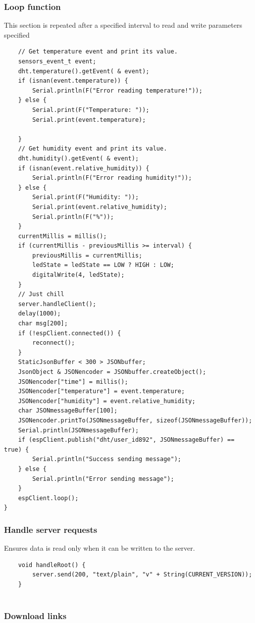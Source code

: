 \subsubsection{Loop function}
This section is repeated after a specified interval to read and write parameters specified

\begin{lstlisting}
	// Get temperature event and print its value.
	sensors_event_t event;
	dht.temperature().getEvent( & event);
	if (isnan(event.temperature)) {
		Serial.println(F("Error reading temperature!"));
	} else {
		Serial.print(F("Temperature: "));
		Serial.print(event.temperature);

	}
	// Get humidity event and print its value.
	dht.humidity().getEvent( & event);
	if (isnan(event.relative_humidity)) {
		Serial.println(F("Error reading humidity!"));
	} else {
		Serial.print(F("Humidity: "));
		Serial.print(event.relative_humidity);
		Serial.println(F("%"));
	}
	currentMillis = millis();
	if (currentMillis - previousMillis >= interval) {
		previousMillis = currentMillis;
		ledState = ledState == LOW ? HIGH : LOW;
		digitalWrite(4, ledState);
	}
	// Just chill
	server.handleClient();
	delay(1000);
	char msg[200];
	if (!espClient.connected()) {
		reconnect();
	}
	StaticJsonBuffer < 300 > JSONbuffer;
	JsonObject & JSONencoder = JSONbuffer.createObject();
	JSONencoder["time"] = millis();
	JSONencoder["temperature"] = event.temperature;
	JSONencoder["humidity"] = event.relative_humidity;
	char JSONmessageBuffer[100];
	JSONencoder.printTo(JSONmessageBuffer, sizeof(JSONmessageBuffer));
	Serial.println(JSONmessageBuffer);
	if (espClient.publish("dht/user_id892", JSONmessageBuffer) == true) {
		Serial.println("Success sending message");
	} else {
		Serial.println("Error sending message");
	}
	espClient.loop();
}

\end{lstlisting}

\subsubsection{Handle server requests}
Ensures data is read only when it can be written to the server. 
\begin{lstlisting}
	void handleRoot() {
		server.send(200, "text/plain", "v" + String(CURRENT_VERSION));
	}
	
\end{lstlisting}
\subsubsection{Download links}

